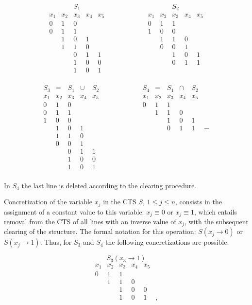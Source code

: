 \documentclass[12pt, a4paper]{article}
\begin{document}
$$
\begin{array}{cccccccccccccccccccc}
&& S_1 && &&&&&&&& && S_2 &&\\[5pt]
x_1&x_2&x_3&x_4&x_5&&&&&&&&x_1&x_2&x_3&x_4&x_5\\[3pt]
0&1&0&&&&&&&&&& 0&1&1&&\\
0&1&1&&&&&&&&&& 1&0&0&&\\
&1&0&1&&&&&&&&& &1&1&0&\\
&1&1&0&&&&&&&&& &0&0&1&\\
&&0&1&1&&&&&&&& &&1&0&1\\
&&1&0&0&&&&&&&& &&0&1&1\\
&&1&0&1&&&&&&&& &&&&\\
\end{array}
$$
\par\medskip
$$
\begin{array}{ccccccccccccccccccccc}
S_3&= &S_1&\cup &S_2&&&&&&&& S_4&=&S_1&\cap &S_2\\[3pt]
x_1&x_2&x_3&x_4&x_5&&&&&&&&x_1&x_2&x_3&x_4&x_5\\[3pt]
0&1&0&&&&&&&&&& 0&1&1&&\\
0&1&1&&&&&&&&&& &1&1&0&\\
1&0&0&&&&&&&&&& &&1&0&1\\
&1&0&1&&&&&&&&& &&0&1&1&-\\
&1&1&0&&&&&&&&& &&&&\\
&0&0&1&&&&&&&&& &&&&\\
&&0&1&1&&&&&&&& &&&&\\
&&1&0&0&&&&&&&& &&&&\\
&&1&0&1&&&&&&&& &&&&\\
\end{array}
$$

In $S_4$ the last line is deleted according to the clearing procedure.

Concretization of the variable $x_j$ in the CTS $S$, $1\le j \le n$, consists in the assignment of a constant value to this variable:
$x_j\equiv 0$ or $x_j\equiv 1$, which entails removal from the CTS of all lines with an inverse value of $x_j$, with the subsequent clearing of the structure. The formal notation for this operation: $S(x_j \to 0)$ or $S(x_j \to 1)$. Thus, for $S_3$ and $S_4$ the following concretizations are possible:

\smallskip
$$S_3(x_3\to 1)$$
$$
\begin{array}{ccccccc}
x_1& x_2& x_3& x_4& x_5\\[5pt]
0&1&1&&\\
&1&1&0&\\
&&1&0&0\\
&&1&0&1&,
\end{array}
$$
\end{document}

